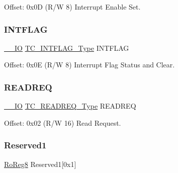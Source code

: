 Offset\+: 0x0D (R/W 8) Interrupt Enable Set. 

\mbox{\label{struct_tc_count16_a076bcac2737bf4d77b94d8ca8362a8f0}} 
\subsubsection{\texorpdfstring{INTFLAG}{INTFLAG}}
{\footnotesize\ttfamily \mbox{\hyperlink{core__cm0plus_8h_aec43007d9998a0a0e01faede4133d6be}{\+\_\+\+\_\+\+IO}} \mbox{\hyperlink{union_t_c___i_n_t_f_l_a_g___type}{T\+C\+\_\+\+I\+N\+T\+F\+L\+A\+G\+\_\+\+Type}} I\+N\+T\+F\+L\+AG}



Offset\+: 0x0E (R/W 8) Interrupt Flag Status and Clear. 

\mbox{\label{struct_tc_count16_a9cb0a3ec797bc9e4a1b1db94d2865b34}} 
\subsubsection{\texorpdfstring{READREQ}{READREQ}}
{\footnotesize\ttfamily \mbox{\hyperlink{core__cm0plus_8h_aec43007d9998a0a0e01faede4133d6be}{\+\_\+\+\_\+\+IO}} \mbox{\hyperlink{union_t_c___r_e_a_d_r_e_q___type}{T\+C\+\_\+\+R\+E\+A\+D\+R\+E\+Q\+\_\+\+Type}} R\+E\+A\+D\+R\+EQ}



Offset\+: 0x02 (R/W 16) Read Request. 

\mbox{\label{struct_tc_count16_a092866123ac46d0985136e4dca2f36f4}} 
\subsubsection{\texorpdfstring{Reserved1}{Reserved1}}
{\footnotesize\ttfamily \mbox{\hyperlink{group___s_a_m_d21_e15_a__definitions_ga0d957f1433aaf5d70e4dc2b68288442d}{Ro\+Reg8}} Reserved1\mbox{[}0x1\mbox{]}}

\mbox{\label{struct_tc_count16_a99ee50bfa44e107c16a546d778dcdcc7}} 
